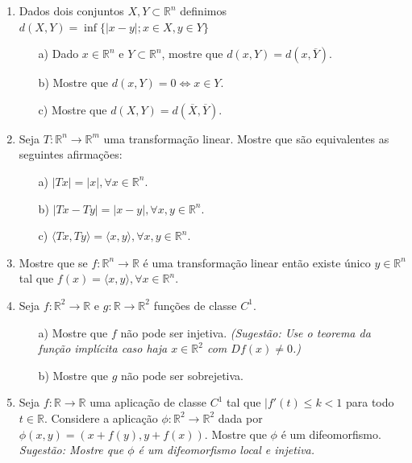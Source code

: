 \documentclass[11pt]{report}
\begin{document}
	\begin{enumerate}
		\item Dados dois conjuntos $X, Y \subset \mathbb{R}^{n}$ definimos $d(X, Y) = \inf\{|x - y|; x \in X,y \in Y\}$
		\begin{enumerate}
			\item[a)] Dado $x \in \mathbb{R}^{n}$ e $Y \subset \mathbb{R}^{n}$, mostre que $d(x,Y) = d(x,\overline{Y}).$
			
			\item[b)] Mostre que $d(x, Y) = 0 \Leftrightarrow x \in Y.$
			
			\item[c)] Mostre que $d(X, Y) = d(\overline{X}, \overline{Y}).$
		\end{enumerate}

		\item Seja $ T: \mathbb{R}^{n} \rightarrow \mathbb{R}^{m}$ uma transformação linear. Mostre que são equivalentes as seguintes afirmações:
		\begin{enumerate}
			\item[a)] $|Tx|=|x|, \forall x \in \mathbb{R}^{n}$.
			
			\item[b)] $|Tx - Ty| = |x - y|, \forall x,y \in \mathbb{R}^{n}$.
			
			\item[c)] $\langle Tx, Ty \rangle = \langle x,y \rangle, \forall x,y \in \mathbb{R}^{n}$.
		\end{enumerate}
	
		\item Mostre que se $f : \mathbb{R}^{n} \rightarrow \mathbb{R}$ é uma transformação linear então existe único $y \in \mathbb{R}^{n}$ tal que $f(x) = \langle x, y \rangle, \forall x \in \mathbb{R}^{n}$.
		
		\item Seja $f : \mathbb{R}^{2} \rightarrow \mathbb{R}$ e $g : \mathbb{R} \rightarrow \mathbb{R}^{2}$ funções de classe $C^{1}$.
		\begin{enumerate}
			\item[a)] Mostre que $f$ não pode ser injetiva. \textit{(Sugestão: Use o teorema da função implícita caso haja $x \in \mathbb{R}^{2}$ com $Df(x) \neq 0$.)}
			
			\item[b)] Mostre que $g$ não pode ser sobrejetiva.
		\end{enumerate}
	
		\item Seja $f : \mathbb{R} \rightarrow \mathbb{R}$ uma aplicação de classe $C^{1}$ tal que $|f\prime(t) \leq k < 1$ para todo $t \in \mathbb{R}$. Considere a aplicação $\phi : \mathbb{R}^{2} \rightarrow \mathbb{R}^{2}$ dada por $\phi(x, y) = (x + f(y), y + f(x))$. Mostre que $\phi$ é um difeomorfismo. \\
		\textit{Sugestão: Mostre que $\phi$ é um difeomorfismo local e injetiva.}
		

\end{enumerate}
\end{document}
